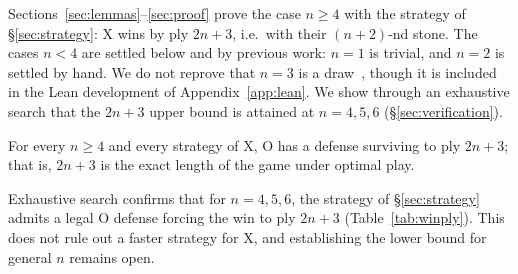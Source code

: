 \medskip
Sections~\ref{sec:lemmas}--\ref{sec:proof} prove the case $n\ge4$ with the strategy of \S\ref{sec:strategy}: X wins by ply $2n+3$, i.e.\ with their $(n+2)$-nd stone. The cases $n<4$ are settled below and by previous work: $n=1$ is trivial, and $n=2$ is settled by hand. We do not reprove that $n=3$ is a draw~\cite{randjelovic}, though it is included in the Lean development of Appendix~\ref{app:lean}. We show through an exhaustive search that the $2n+3$ upper bound is attained at $n=4,5,6$ (\S\ref{sec:verification}).

\begin{conjecture}
\label{conj:sharp}
For every $n\ge4$ and every strategy of X, O has a defense surviving to
ply $2n+3$; that is, $2n+3$ is the exact length of the game under optimal
play.
\end{conjecture}

Exhaustive search confirms that for $n=4,5,6$, the strategy of
\S\ref{sec:strategy} admits a legal O defense forcing the win to ply
$2n+3$ (Table~\ref{tab:winply}). This does not rule out a faster strategy
for X, and establishing the lower bound for general $n$ remains open.
